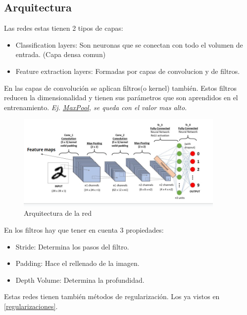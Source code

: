 \documentclass[titlepage,a4paper]{article}
\begin{document}
\subsection*{Arquitectura}
Las redes estas tienen 2 tipos de capas:
\begin{itemize}
    \item Classification layers: Son neuronas que se conectan con todo el volumen de entrada. (Capa densa comun)
    \item Feature extraction layers: Formadas por capas de convolucion y de filtros.
\end{itemize}

En las capas de convolución se aplican filtros(o kernel) también. Estos filtros reducen la dimensionalidad y tienen sus parámetros que son aprendidos en el entrenamiento. \textit{Ej. \href{https://developers.google.com/machine-learning/practica/image-classification/images/maxpool_animation.gif?hl=es}{MaxPool}, se queda con el valor mas alto}.

\begin{figure}[!htb]
    \centering
    \includegraphics[width=0.9\textwidth]{imagenesResumen/ArquitecturaRedConvolucional.PNG}
    \caption{Arquitectura de la red}
\end{figure}

En los filtros hay que tener en cuenta 3 propiedades:
\begin{itemize}
    \item Stride: Determina los pasos del filtro.
    \item Padding: Hace el rellenado de la imagen.
    \item Depth Volume: Determina la profundidad.
\end{itemize}

Estas redes tienen también métodos de regularización. Los ya vistos en \ref{regularizaciones}.

\newpage
\end{document}
